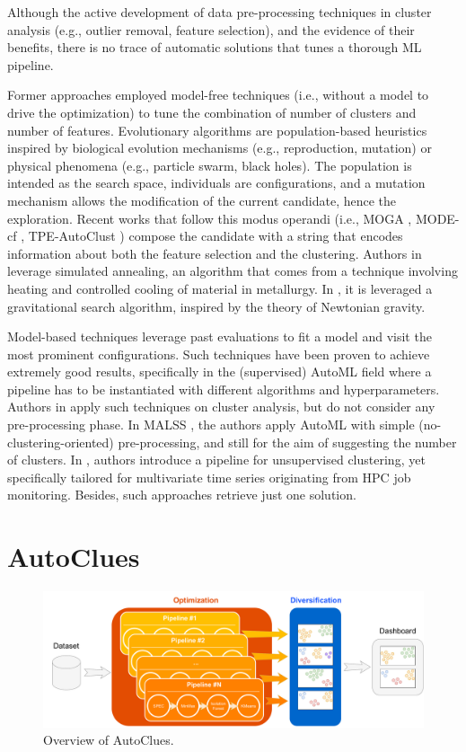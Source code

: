 \documentclass[runningheads]{llncs}
\begin{document}
Although the active development of data pre-processing techniques in cluster analysis (e.g., outlier removal, feature selection), and the evidence of their benefits, there is no trace of automatic solutions that tunes a thorough ML pipeline.

Former approaches employed model-free techniques (i.e., without a model to drive the optimization) to tune the combination of number of clusters and number of features.
Evolutionary algorithms are population-based heuristics inspired by biological evolution mechanisms (e.g., reproduction, mutation) or physical phenomena (e.g., particle swarm, black holes).
The population is intended as the search space, individuals are configurations, and a mutation mechanism allows the modification of the current candidate, hence the exploration.
Recent works that follow this modus operandi (i.e., MOGA \cite{dutta2013}, MODE-cf \cite{hancer2020new}, TPE-AutoClust \cite{10031132}) compose the candidate with a string that encodes information about both the feature selection and the clustering.
Authors in \cite{simulate_annealing} leverage simulated annealing, an algorithm that comes from a technique involving heating and controlled cooling of material in metallurgy.
In \cite{prakash2019gravitational}, it is leveraged a gravitational search algorithm, inspired by the theory of Newtonian gravity.

Model-based techniques leverage past evaluations to fit a model and visit the most prominent configurations.
Such techniques have been proven to achieve extremely good results, specifically in the (supervised) AutoML field where a pipeline has to be instantiated with different algorithms and hyperparameters.
Authors in \cite{Tschechlov2021,poulakis2020autoclust,Liu2021} apply such techniques on cluster analysis, but do not consider any pre-processing phase.
In MALSS \cite{Kamoshida2020}, the authors apply AutoML with simple (no-clustering-oriented) pre-processing, and still for the aim of suggesting the number of clusters.
In \cite{ENES20231}, authors introduce a pipeline for unsupervised clustering, yet specifically tailored for multivariate time series originating from HPC job monitoring.
Besides, such approaches retrieve just one solution.

\section{AutoClues}\label{sec:autoclues}

\begin{figure}[t]
    \centering
    \includegraphics[scale=.26]{img/approach.pdf}
    \caption{Overview of AutoClues.}
    \label{fig:overview}
\end{figure}
\end{document}
